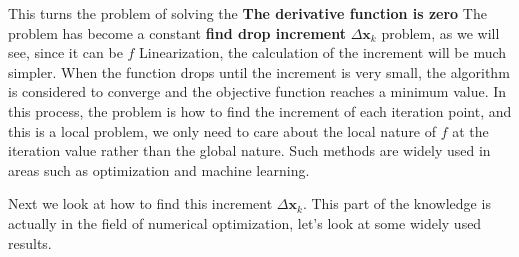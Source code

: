 This turns the problem of solving the \textbf{The derivative function is zero} The problem has become a constant \textbf{find drop increment} $\Delta \bm{x}_k$ problem, as we will see, since it can be $f$ Linearization, the calculation of the increment will be much simpler. When the function drops until the increment is very small, the algorithm is considered to converge and the objective function reaches a minimum value. In this process, the problem is how to find the increment of each iteration point, and this is a local problem, we only need to care about the local nature of $f$ at the iteration value rather than the global nature. Such methods are widely used in areas such as optimization and machine learning.
	
Next we look at how to find this increment $\Delta \bm{x}_k$. This part of the knowledge is actually in the field of numerical optimization, let's look at some widely used results.







